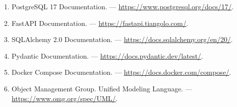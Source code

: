 \documentclass[14pt,a4paper]{extarticle}
\begin{document}
\begin{enumerate}[label={\lbrack\arabic*\rbrack}]
    \item PostgreSQL 17 Documentation. --- \url{https://www.postgresql.org/docs/17/}.
    \item FastAPI Documentation. --- \url{https://fastapi.tiangolo.com/}.
    \item SQLAlchemy 2.0 Documentation. --- \url{https://docs.sqlalchemy.org/en/20/}.
    \item Pydantic Documentation. --- \url{https://docs.pydantic.dev/latest/}.
    \item Docker Compose Documentation. --- \url{https://docs.docker.com/compose/}.
    \item Object Management Group. Unified Modeling Language. --- \url{https://www.omg.org/spec/UML/}.
\end{enumerate}
\end{document}
